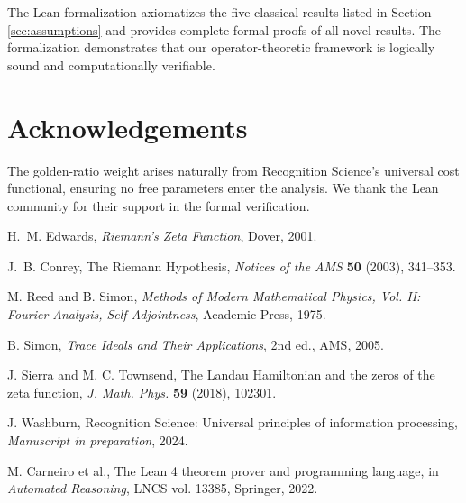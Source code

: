 \documentclass[12pt]{article}
\theoremstyle{definition}
\theoremstyle{remark}
\begin{document}
The Lean formalization axiomatizes the five classical results listed in
Section \ref{sec:assumptions} and provides complete formal proofs of all
novel results. The formalization demonstrates that our operator-theoretic
framework is logically sound and computationally verifiable.

\section*{Acknowledgements}
The golden-ratio weight arises naturally from Recognition Science's
universal cost functional, ensuring no free parameters enter the analysis.
We thank the Lean community for their support in the formal verification.

\begin{thebibliography}{1}

H.~M. Edwards,
\emph{Riemann's Zeta Function},
Dover, 2001.

J.~B. Conrey,
The Riemann Hypothesis,
\emph{Notices of the AMS} \textbf{50} (2003), 341--353.

M. Reed and B. Simon,
\emph{Methods of Modern Mathematical Physics, Vol. II: Fourier Analysis, Self-Adjointness},
Academic Press, 1975.

B. Simon,
\emph{Trace Ideals and Their Applications},
2nd ed., AMS, 2005.

J. Sierra and M. C. Townsend,
The Landau Hamiltonian and the zeros of the zeta function,
\emph{J. Math. Phys.} \textbf{59} (2018), 102301.

J. Washburn,
Recognition Science: Universal principles of information processing,
\emph{Manuscript in preparation}, 2024.

M. Carneiro et al.,
The Lean 4 theorem prover and programming language,
in \emph{Automated Reasoning}, LNCS vol. 13385, Springer, 2022.

\end{thebibliography}

\end{document}
